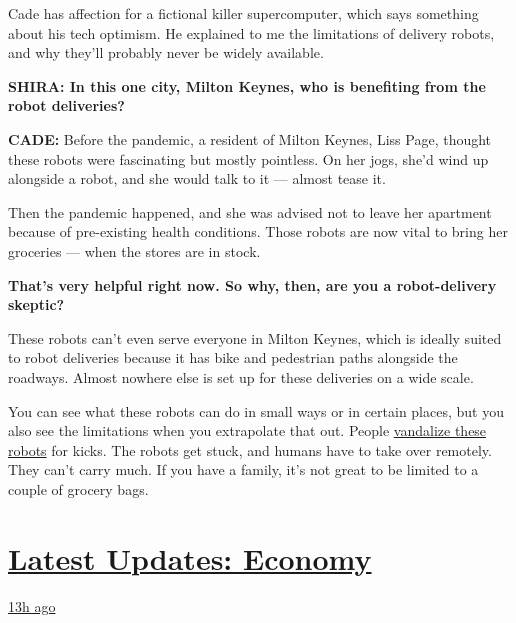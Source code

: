 Cade has affection for a fictional killer supercomputer, which says
something about his tech optimism. He explained to me the limitations of
delivery robots, and why they'll probably never be widely available.

\textbf{SHIRA: In this one city, Milton Keynes, who is benefiting from
the robot deliveries?}

\textbf{CADE:} Before the pandemic, a resident of Milton Keynes, Liss
Page, thought these robots were fascinating but mostly pointless. On her
jogs, she'd wind up alongside a robot, and she would talk to it ---
almost tease it.

Then the pandemic happened, and she was advised not to leave her
apartment because of pre-existing health conditions. Those robots are
now vital to bring her groceries --- when the stores are in stock.

\textbf{That's very helpful right now. So why, then, are you a
robot-delivery skeptic?}

These robots can't even serve everyone in Milton Keynes, which is
ideally suited to robot deliveries because it has bike and pedestrian
paths alongside the roadways. Almost nowhere else is set up for these
deliveries on a wide scale.

You can see what these robots can do in small ways or in certain places,
but you also see the limitations when you extrapolate that out. People
\href{https://www.sfchronicle.com/business/article/Kiwibots-win-fans-at-UC-Berkeley-as-they-deliver-13895867.php?psid=9L4Fj}{vandalize
these robots} for kicks. The robots get stuck, and humans have to take
over remotely. They can't carry much. If you have a family, it's not
great to be limited to a couple of grocery bags.

\hypertarget{latest-updates-economy}{%
\section{\texorpdfstring{\href{https://www.nytimes.com/live/2020/08/03/business/stock-market-today-coronavirus?action=click\&pgtype=Article\&state=default\&region=MAIN_CONTENT_1\&context=storylines_live_updates}{Latest
Updates:
Economy}}{Latest Updates: Economy}}\label{latest-updates-economy}}

\href{https://www.nytimes.com/live/2020/08/03/business/stock-market-today-coronavirus?action=click\&pgtype=Article\&state=default\&region=MAIN_CONTENT_1\&context=storylines_live_updates\#the-chicago-fed-president-says-its-up-to-congress-to-save-the-economy}{13h
ago}

